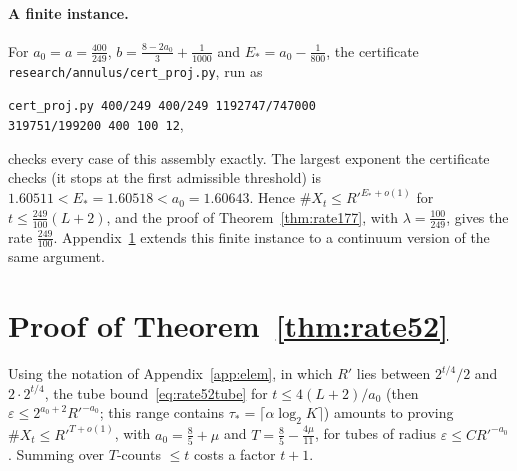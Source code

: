 \documentclass[aps,prx,twocolumn,superscriptaddress,nofootinbib,longbibliography]{revtex4-2}
\theoremstyle{plain}
\theoremstyle{definition}
\theoremstyle{remark}
\begin{document}
\paragraph{A finite instance.} For $a_0=a=\tfrac{400}{249}$, $b=\tfrac{8-2a_0}3+\tfrac1{1000}$ and $E_*=a_0-\tfrac1{800}$, the certificate \texttt{research/\allowbreak annulus/\allowbreak cert\_proj.py}, run as
\begin{center}\small\texttt{cert\_proj.py 400/249 400/249 1192747/747000}\\ \texttt{319751/199200 400 100 12},\end{center}
checks every case of this assembly exactly. The largest exponent the certificate checks (it stops at the first admissible threshold) is $1.60511<E_*=1.60518<a_0=1.60643$. Hence $\#X_t\le R'^{E_*+o(1)}$ for $t\le\tfrac{249}{100}(L+2)$, and the proof of Theorem~\ref{thm:rate177}, with $\lambda=\tfrac{100}{249}$, gives the rate $\tfrac{249}{100}$. Appendix~\ref{app:rate52} extends this finite instance to a continuum version of the same argument.

\section{Proof of Theorem~\ref{thm:rate52}}\label{app:rate52}

Using the notation of Appendix~\ref{app:elem}, in which $R'$ lies between $2^{t/4}/2$ and $2\cdot2^{t/4}$, the tube bound~\eqref{eq:rate52tube} for $t\le4(L+2)/a_0$ (then $\varepsilon\le2^{a_0+2}R'^{-a_0}$; this range contains $\tau_*=\lceil\alpha\log_2K\rceil$) amounts to proving $\#X_t\le R'^{T+o(1)}$, with $a_0=\tfrac85+\mu$ and $T=\tfrac85-\tfrac{4\mu}{11}$, for tubes of radius $\varepsilon\le CR'^{-a_0}$. Summing over $T$-counts $\le t$ costs a factor $t+1$.
\end{document}
